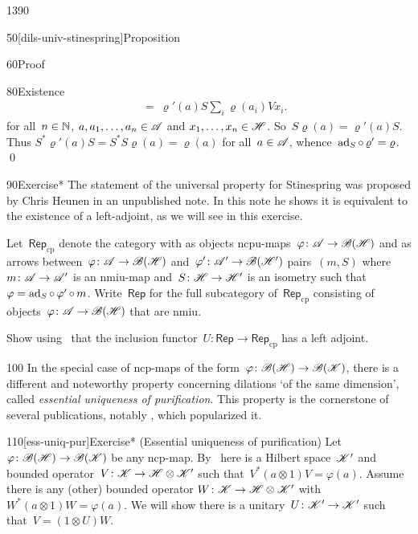 \begin{parsec}{1390}
\begin{point}{50}[dils-univ-stinespring]{Proposition}
\begin{point}{60}{Proof}
\begin{point}{80}{Existence}
\begin{align*}
    &\ =\ \varrho'(a) S \sum_i \varrho(a_i)V x_i.
\end{align*}
for all~$n \in \mathbb{N}$, $a, a_1, \ldots, a_n \in \mathscr{A}$ and
    $x_1, \ldots, x_n \in \mathscr{H}$.
So~$S \varrho(a) = \varrho'(a)S$.
Thus $S^* \varrho'(a) S = S^*S\varrho(a) = \varrho(a)$ for all~$a\in \mathscr{A}$,
whence~$\mathrm{ad}_S \mathop{\circ} \varrho' = \varrho$. \qed
\end{point}
\end{point}
\end{point}
\begin{point}{90}{Exercise*}%
    The statement of the universal property
        for Stinespring
        was proposed by Chris Heunen in an unpublished note.
    In this note he shows it is equivalent to the existence
        of a left-adjoint, as we will see in this exercise.
    
    Let~$\mathsf{Rep}_{\mathrm{cp}}$
        denote the category with as objects
            ncpu-maps~$\varphi\colon \mathscr{A} \to \mathscr{B}(\mathscr{H})$
            and as arrows between~$\varphi\colon \mathscr{A} \to \mathscr{B}(\mathscr{H})$
            and~$\varphi'\colon \mathscr{A}' \to \mathscr{B}(\mathscr{H}')$
            pairs~$(m, S)$
            where~$m\colon \mathscr{A} \to \mathscr{A}'$ is an nmiu-map
            and~$S\colon \mathscr{H} \to \mathscr{H}'$ is an isometry
            such that~$\varphi = \mathrm{ad}_S \mathop{\circ} \varphi' \mathop{\circ} m$.
    Write~$\mathsf{Rep}$
        for the full subcategory of~$\mathsf{Rep}_{\mathrm{cp}}$
        consisting of objects~$\varphi\colon \mathscr{A} \to \mathscr{B}(\mathscr{H})$
            that are nmiu.

Show using~
    that the inclusion functor~$U \colon \mathsf{Rep}
    \to \mathsf{Rep}_{\mathrm{cp}}$ has a left adjoint.
\par %
\begin{point}{100}%
In the special case of ncp-maps
    of the form~$\varphi \colon \mathscr{B}(\mathscr{H}) \to \mathscr{B}(\mathscr{K})$,
    there is a different and noteworthy  property
    concerning dilations `of the same dimension',
    called \emph{essential uniqueness of purification}.
This property is the cornerstone of several publications,
    notably \cite{chiribella}, which popularized it.
\par %
\end{point}
\end{point}
\begin{point}{110}[ess-uniq-pur]{Exercise* (Essential uniqueness of purification)}
    Let~$\varphi \colon \mathscr{B}(\mathscr{H}) \to \mathscr{B}(\mathscr{K})$
        be any ncp-map.
    By~
    here is a Hilbert space~$\mathscr{K}'$
        and bounded operator~$V\colon \mathscr{K} \to \mathscr{H} \otimes \mathscr{K}'$
        such that~$V^* (a\otimes 1) V = \varphi(a)$.
        Assume there is any (other) bounded operator
        $W\colon \mathscr{K} \to \mathscr{H} \otimes \mathscr{K}'$
        with~$W^* (a \otimes 1) W = \varphi(a)$.
    We will show there is a unitary~$U \colon \mathscr{K}' \to \mathscr{K}'$
    such that~$V = (1 \otimes U) W$.


\end{point}
\end{parsec}
